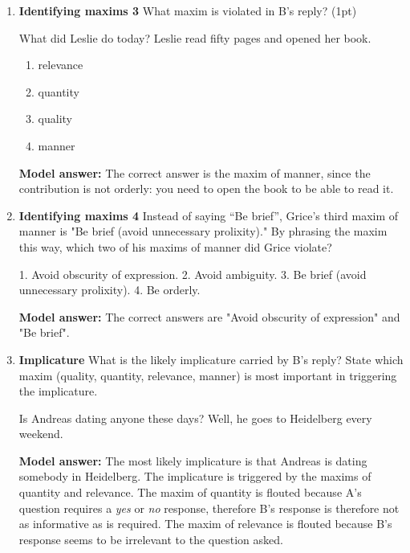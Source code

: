 \documentclass[a4,11pt]{article}
\newcommand{\6}{\mbox{$[\hspace*{-.6mm}[$}}
\newcommand{\9}{\mbox{$]\hspace*{-.6mm}]$}}
\begin{document}
\begin{enumerate}[leftmargin = 12pt]
{ \bf Model answer:} The  correct answer is the maxim of manner, because the contribution is not brief.

\item  { \bf Identifying maxims 3}  What maxim is violated in B's reply? (1pt)


\begin{exe}
 What did Leslie do today?
 Leslie read fifty pages and opened her book.
\end{exe}

\begin{enumerate}[noitemsep]
\item relevance
\item quantity
\item quality
\item manner
\end{enumerate}

{ \bf Model answer:} The  correct answer is the maxim of manner, since the contribution is not orderly: you need to open the book to be able to read it.

\item  { \bf Identifying maxims 4}  Instead of saying “Be brief”, Grice's third maxim of manner is "Be brief (avoid unnecessary prolixity)." By phrasing the maxim this way, which two of his maxims of manner did Grice violate?

\begin{enumerate}
1. Avoid obscurity of expression.
2. Avoid ambiguity.
3. Be brief (avoid unnecessary prolixity). 4. Be orderly.
\end{enumerate}

{ \bf Model answer:} The correct answers are "Avoid obscurity of expression" and  "Be brief". 


\item  { \bf Implicature}  What is the likely implicature carried by B's reply? State which maxim (quality, quantity, relevance, manner) is most important in triggering the implicature.

\begin{exe}
 Is Andreas dating anyone these days?
 Well, he goes to Heidelberg every weekend.
\end{exe}

{ \bf Model answer:} The most likely implicature is that Andreas is dating somebody in Heidelberg. The implicature is triggered by the maxims of quantity and relevance. The maxim of quantity is flouted because A's question requires a \textit{yes} or \textit{no} response, therefore B's response is therefore not as informative as is required. The maxim of relevance is flouted because B's response seems to be irrelevant to the question asked.



\end{enumerate}
\end{document}
